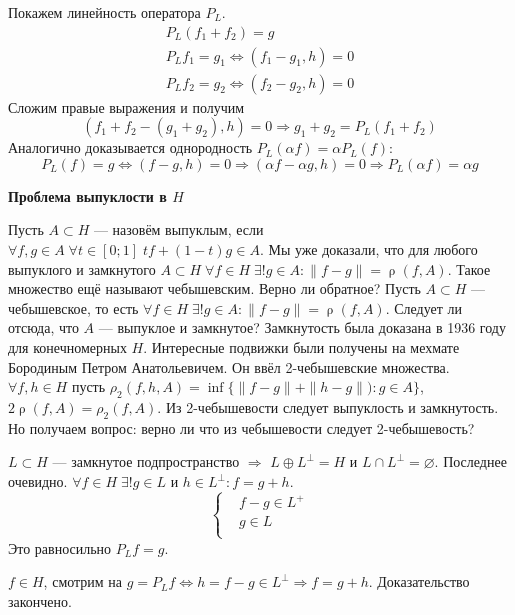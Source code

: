 \documentclass[14pt]{extarticle}
\DeclareMathOperator{\rh}{\rho}
\begin{document}
Покажем линейность оператора $P_L$.
\begin{gather*}
    P_L(f_1 + f_2) = g\\
    P_Lf_1 = g_1 \Leftrightarrow (f_1 - g_1, h) = 0\\
    P_Lf_2 = g_2 \Leftrightarrow (f_2 - g_2, h) = 0
\end{gather*}
Сложим правые выражения и получим
$$
(f_1 + f_2 - (g_1 + g_2), h) = 0 \Rightarrow g_1 + g_2 = P_L(f_1 + f_2)
$$
Аналогично доказывается однородность $P_L(\alpha f) = \alpha P_L(f)$: 
$$
P_L(f) = g \Leftrightarrow (f - g, h) = 0\Rightarrow (\alpha f - \alpha g, h) = 0\Rightarrow P_L(\alpha f) = \alpha g
$$

\textbf{Проблема выпуклости в $H$}

Пусть $A \subset H$ --- назовём выпуклым, если $\forall f,g \in A\;\forall t \in [0;1]\;t f + (1 - t) g \in A$.
Мы уже доказали, что для любого выпуклого и замкнутого $A \subset H\;\forall f \in H\;\exists! g \in A\colon \|f - g\| = \rh(f, A)$.
Такое множество ещё называют чебышевским.
Верно ли обратное? Пусть $A \subset H$ --- чебышевское, то есть $\forall f \in H\;\exists! g \in A\colon \|f - g\| = \rh(f,A)$. 
Следует ли отсюда, что $A$ --- выпуклое и замкнутое?
Замкнутость была доказана в 1936 году для конечномерных $H$.
Интересные подвижки были получены на мехмате Бородиным Петром Анатольевичем.
Он ввёл 2-чебышевские множества.
$\forall f,h \in H$ пусть $\rho_2(f, h, A) = \inf\{\|f - g\| + \|h - g\|):g \in A\}$, $2\rh(f, A) = \rho_2(f, A)$.
Из 2-чебышевости следует выпуклость и замкнутость.
Но получаем вопрос: верно ли что из чебышевости следует 2-чебышевость?

\begin{Theor}
    $L \subset H$ --- замкнутое подпространство $\Rightarrow$ $L \oplus L^\perp = H$ и $L \cap L^\perp = \varnothing$.
    Последнее очевидно. 
    $\forall f \in H\;\exists! g \in L$ и $h \in L^\perp\colon f = g + h$.
    $$
    \left\{
        \begin{aligned}
            &f - g \in L^{+}\\
            &g \in L\\
        \end{aligned}
    \right.
    $$
    Это равносильно $P_Lf = g$.
\end{Theor}
\begin{Proof}
$f \in H$, смотрим на $g = P_Lf \Leftrightarrow h = f - g \in L^\perp\Rightarrow f = g + h$.
Доказательство закончено.
\end{Proof}
\end{document}
